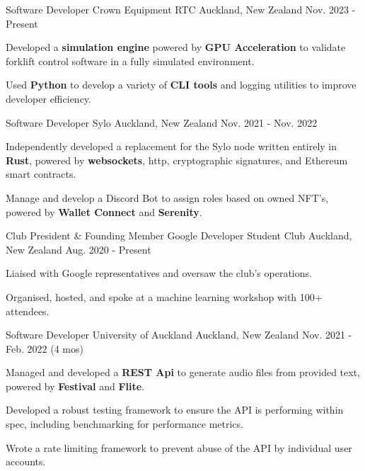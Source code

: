 
\begin{cventries}

  \cventry
    {Software Developer}
    {Crown Equipment RTC}
    {Auckland, New Zealand}
    {Nov. 2023 - Present}
    {
      \begin{cvitems}
        \item {Developed a \textbf{simulation engine} powered by \textbf{GPU Acceleration} to validate forklift control software in a fully simulated environment.}
        \item {Used \textbf{Python} to develop a variety of \textbf{CLI tools} and logging utilities to improve developer efficiency.}
      \end{cvitems}
    }

  \cventry
    {Software Developer} %
    {Sylo} %
    {Auckland, New Zealand} %
    {Nov. 2021 - Nov. 2022} %
    {
      \begin{cvitems} %
        \item {Independently developed a replacement for the Sylo node written entirely in \textbf{Rust}, powered by \textbf{websockets}, http, cryptographic signatures, and Ethereum smart contracts.}
        \item {Manage and develop a Discord Bot to assign roles based on owned NFT's, powered by \textbf{Wallet Connect} and \textbf{Serenity}.}
      \end{cvitems}
    }

  \cventry
    {Club President \& Founding Member} %
    {Google Developer Student Club} %
    {Auckland, New Zealand} %
    {Aug. 2020 - Present} %
    {
      \begin{cvitems} %
        \item {Liaised with Google representatives and oversaw the club's operations.}
        \item {Organised, hosted, and spoke at a machine learning workshop with 100+ attendees.}
      \end{cvitems}
    }

  \cventry
    {Software Developer} %
    {University of Auckland} %
    {Auckland, New Zealand} %
    {Nov. 2021 - Feb. 2022 (4 mos)} %
    {
      \begin{cvitems} %
        \item {Managed and developed a \textbf{REST Api} to generate audio files from provided text, powered by \textbf{Festival} and \textbf{Flite}.}
        \item {Developed a robust testing framework to ensure the API is performing within spec, including benchmarking for performance metrics.}
        \item {Wrote a rate limiting framework to prevent abuse of the API by individual user accounts.}
      \end{cvitems}
    }



\end{cventries}
